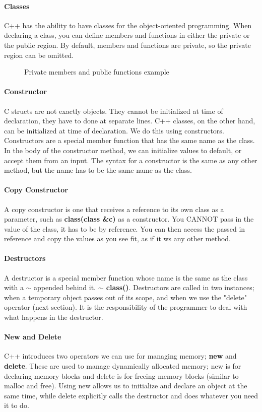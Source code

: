 \paragraph{Classes} C++ has the ability to have classes for the object-oriented programming. When declaring a class, you can define members and functions in either the private or the public region. By default, members and functions are private, so the private region can be omitted. 
\begin{figure}[!htb]
	\caption{\label{fig:classes} Private members and public functions example}
\end{figure}
\paragraph{Constructor} C structs are not exactly objects. They cannot be initialized at time of declaration, they have to done at separate lines. C++ classes, on the other hand, can be initialized at time of declaration. We do this using constructors. Constructors are a special member function that has the same name as the class. In the body of the constructor method, we can initialize values to default, or accept them from an input. The syntax for a constructor is the same as any other method, but the name has to be the same name as the class.
\paragraph{Copy Constructor} A copy constructor is one that receives a reference to its own class as a parameter, such as \textbf{class(class \&c)} as a constructor. You CANNOT pass in the value of the class, it has to be by reference. You can then access the passed in reference and copy the values as you see fit, as if it ws any other method.
\paragraph{Destructors} A destructor is a special member function whose name is the same as the class with a $\sim$ appended behind it. \textbf{$\sim$ class()}. Destructors are called in two instances; when a temporary object passes out of its scope, and when we use the "delete" operator (next section). It is the responsibility of the programmer to deal with what happens in the destructor.
\paragraph{New and Delete} C++ introduces two operators we can use for managing memory; \textbf{new} and \textbf{delete}. These are used to manage dynamically allocated memory; new is for declaring memory blocks and delete is for freeing memory blocks (similar to malloc and free). Using new allows us to initialize and declare an object at the same time, while delete explicitly calls the destructor and does whatever you need it to do.
